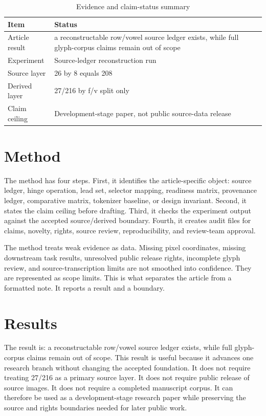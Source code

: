 \documentclass[sigconf,nonacm]{acmart}
\begin{document}
\begin{table}[t]
\caption{Evidence and claim-status summary}
\label{tab:article_na_001}
\begin{tabular}{p{}p{}}
\toprule
Item & Status \\
\midrule
Article result & a reconstructable row/vowel source ledger exists, while full glyph-corpus claims remain out of scope \\
Experiment & Source-ledger reconstruction run \\
Source layer & 26 by 8 equals 208 \\
Derived layer & 27/216 by f/v split only \\
Claim ceiling & Development-stage paper, not public source-data release \\
\bottomrule
\end{tabular}
\end{table}


\section{Method}
The method has four steps. First, it identifies the article-specific object:
source ledger, hinge operation, lead set, selector mapping, readiness matrix,
provenance ledger, comparative matrix, tokenizer baseline, or design invariant.
Second, it states the claim ceiling before drafting. Third, it checks the
experiment output against the accepted source/derived boundary. Fourth, it
creates audit files for claims, novelty, rights, source review, reproducibility,
and review-team approval.

The method treats weak evidence as data. Missing pixel coordinates, missing
downstream task results, unresolved public release rights, incomplete glyph
review, and source-transcription limits are not smoothed into confidence. They
are represented as scope limits. This is what separates the article from a
formatted note. It reports a result and a boundary.

\section{Results}
The result is: a reconstructable row/vowel source ledger exists, while full glyph-corpus claims remain out of scope. This result is useful because it advances one research
branch without changing the accepted foundation. It does not require treating
27/216 as a primary source layer. It does not require public release of source
images. It does not require a completed manuscript corpus. It can therefore be
used as a development-stage research paper while preserving the source and
rights boundaries needed for later public work.
\end{document}
